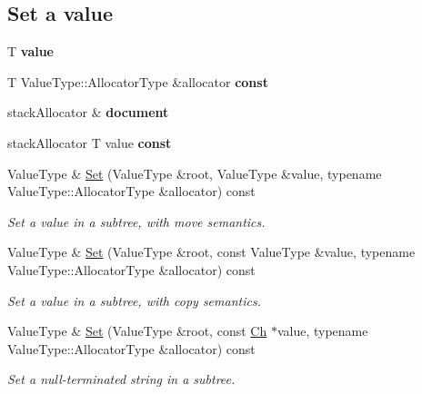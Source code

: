 \subsection*{Set a value}
\begin{DoxyCompactItemize}
\item 
\mbox{\label{class_generic_pointer_a08ef35da0ea9a51d8265a360f0c34540}} 
T {\bfseries value}
\item 
T Value\+Type\+::\+Allocator\+Type \&allocator {\bfseries const}
\item 
\mbox{\label{class_generic_pointer_afd073c4e3be53fd7ec08aec9f75fbaa9}} 
stack\+Allocator \& {\bfseries document}
\item 
stack\+Allocator T value {\bfseries const}
\item 
Value\+Type \& \hyperlink{class_generic_pointer_a71476d125a276b62a246990da1bd3468}{Set} (Value\+Type \&root, Value\+Type \&value, typename Value\+Type\+::\+Allocator\+Type \&allocator) const
\begin{DoxyCompactList}\small\item\em Set a value in a subtree, with move semantics. \end{DoxyCompactList}\item 
\mbox{\label{class_generic_pointer_a61c0e9695cb0c96d465c8e1c21bd48fa}} 
Value\+Type \& \hyperlink{class_generic_pointer_a61c0e9695cb0c96d465c8e1c21bd48fa}{Set} (Value\+Type \&root, const Value\+Type \&value, typename Value\+Type\+::\+Allocator\+Type \&allocator) const
\begin{DoxyCompactList}\small\item\em Set a value in a subtree, with copy semantics. \end{DoxyCompactList}\item 
\mbox{\label{class_generic_pointer_a37ea2d2b205d3642d1e615b8b866666b}} 
Value\+Type \& \hyperlink{class_generic_pointer_a37ea2d2b205d3642d1e615b8b866666b}{Set} (Value\+Type \&root, const \hyperlink{class_generic_pointer_ab292356c11b4015c98d21b966b11f285}{Ch} $\ast$value, typename Value\+Type\+::\+Allocator\+Type \&allocator) const
\begin{DoxyCompactList}\small\item\em Set a null-\/terminated string in a subtree. \end{DoxyCompactList}\item 

\end{DoxyCompactItemize}
